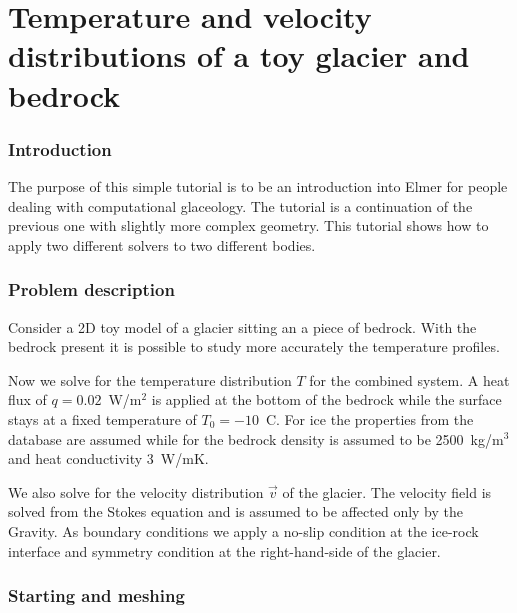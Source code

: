 \chapter{Temperature and velocity distributions of a toy glacier and bedrock}



\subsection*{Introduction}

The purpose of this simple tutorial is to be an introduction into Elmer for people dealing with computational glaceology.
The tutorial is a continuation of the previous one with slightly more complex geometry. 
This tutorial shows how to apply two different solvers to two different bodies. 




\subsection*{Problem description}

Consider a 2D toy model of a glacier sitting an a piece of bedrock. 
With the bedrock present it is possible to study more accurately the temperature profiles. 

Now we solve for the temperature distribution $T$ for the combined system.
A heat flux of $q=0.02$~W/m$^2$ is applied at the bottom of the bedrock while the surface stays at a
fixed temperature of $T_0=-10$~C. For ice the properties from the database are assumed while for
the bedrock density is assumed to be 2500~kg/m$^3$ and heat conductivity 3~W/mK. 

We also solve for the velocity distribution $\vec{v}$ of the glacier. 
The velocity field is solved from the Stokes equation and is assumed to be affected only by the Gravity.
As boundary conditions we apply a no-slip condition at the ice-rock interface and symmetry condition at the 
right-hand-side of the glacier. 



\subsection*{Starting and meshing}

